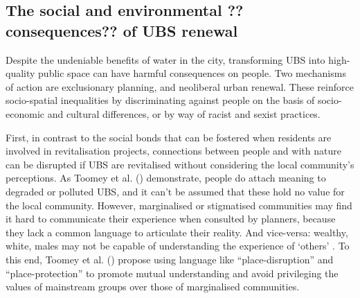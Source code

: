 \documentclass{article}
\begin{document}
\subsection{The social and environmental ??consequences?? of UBS renewal}

Despite the undeniable benefits of water in the city, transforming UBS into high-quality public space can have harmful consequences on people.
Two mechanisms of action are exclusionary planning, and neoliberal urban renewal. These reinforce socio-spatial inequalities by discriminating against people on the basis of socio-economic and cultural differences, or by way of racist and sexist practices.

First, in contrast to the social bonds that can be fostered when residents are involved in revitalisation projects, connections between people and with nature can be disrupted if UBS are revitalised without considering the local community's perceptions. As Toomey et al. (\citeyear{toomey2021place}) demonstrate, people do attach meaning to degraded or polluted UBS, and it can't be assumed that these hold no value for the local community. 
However, marginalised or stigmatised communities may find it hard to communicate their experience when consulted by planners, because they lack a common language to articulate their reality. And vice-versa: wealthy, white, males may not be capable of understanding the experience of `others' \parencite{anguelovski2020expanding}. To this end, Toomey et al. (\citeyear{toomey2021place}) propose using language like ``place-disruption'' and ``place-protection'' to promote mutual understanding and avoid privileging the values of mainstream groups over those of marginalised communities.
\end{document}
